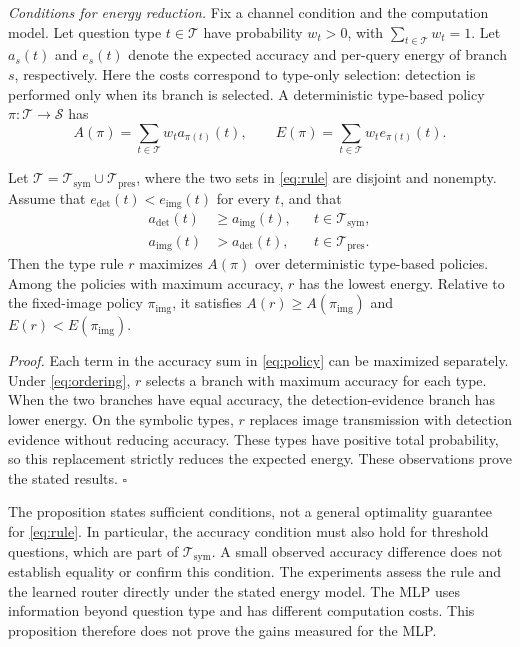 \emph{Conditions for energy reduction.}
\label{subsec:pareto-theory}
Fix a channel condition and the computation model. Let question type
$t\in\mathcal T$ have probability $w_t>0$, with
$\sum_{t\in\mathcal T}w_t=1$. Let $a_s(t)$ and $e_s(t)$ denote the
expected accuracy and per-query energy of branch $s$, respectively.
Here the costs correspond to type-only selection: detection is
performed only when its branch is selected. A deterministic
type-based policy $\pi:\mathcal T\to\mathcal S$ has
\begin{equation}
A(\pi)=\sum_{t\in\mathcal T}w_t a_{\pi(t)}(t),
\qquad
E(\pi)=\sum_{t\in\mathcal T}w_t e_{\pi(t)}(t).
\label{eq:policy}
\end{equation}

\begin{proposition}\label{prop:pareto}
Let $\mathcal T=\mathcal T_{\mathrm{sym}}\cup\mathcal T_{\mathrm{pres}}$,
where the two sets in \eqref{eq:rule} are disjoint and nonempty. Assume that
$e_{\mathrm{det}}(t)<e_{\mathrm{img}}(t)$ for every $t$, and that
\begin{equation}
\begin{aligned}
a_{\mathrm{det}}(t)&\ge a_{\mathrm{img}}(t),
&&t\in\mathcal T_{\mathrm{sym}},\\
a_{\mathrm{img}}(t)&>a_{\mathrm{det}}(t),
&&t\in\mathcal T_{\mathrm{pres}}.
\end{aligned}
\label{eq:ordering}
\end{equation}
Then the type rule $r$ maximizes $A(\pi)$ over deterministic type-based
policies. Among the policies with maximum accuracy, $r$ has the lowest
energy. Relative to the fixed-image policy $\pi_{\mathrm{img}}$,
it satisfies $A(r)\ge A(\pi_{\mathrm{img}})$ and
$E(r)<E(\pi_{\mathrm{img}})$.
\end{proposition}

\emph{Proof.}
Each term in the accuracy sum in \eqref{eq:policy} can be maximized
separately. Under \eqref{eq:ordering}, $r$ selects a branch with maximum
accuracy for each type. When the two branches have equal accuracy,
the detection-evidence branch has lower energy. On the symbolic
types, $r$ replaces image transmission with detection evidence without
reducing accuracy. These types have positive total probability, so
this replacement strictly reduces the expected energy.
These observations prove the stated results. \hfill$\square$

The proposition states sufficient conditions, not a general
optimality guarantee for \eqref{eq:rule}. In particular, the accuracy
condition must also hold for threshold questions, which are part of
$\mathcal T_{\mathrm{sym}}$. A small observed accuracy difference does
not establish equality or confirm this condition. The
experiments assess the rule and the learned router directly under
the stated energy model. The MLP uses information beyond question
type and has different computation costs. This proposition therefore
does not prove the gains measured for the MLP.
